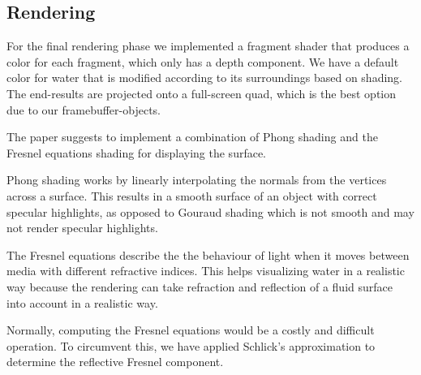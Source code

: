 \subsection{Rendering}
For the final rendering phase we implemented a fragment shader that produces a color for each fragment, which only has a depth component.
We have a default color for water that is modified according to its surroundings based on shading. 
The end-results are projected onto a full-screen quad, which is the best option due to our framebuffer-objects.

The paper suggests to implement a combination of Phong shading and the Fresnel equations shading for displaying the surface. 

Phong shading works by linearly interpolating the normals from the vertices across a surface\cite{phong1975illumination}. 
This results in a smooth surface of an object with correct specular highlights, as opposed to Gouraud shading which is not smooth and may not render specular highlights.

The Fresnel equations describe the the behaviour of light when it moves between media with different refractive indices. 
This helps visualizing water in a realistic way because the rendering can take refraction and reflection of a fluid surface into account in a realistic way.

Normally, computing the Fresnel equations would be a costly and difficult operation. To circumvent this, we have applied Schlick's approximation to determine the reflective Fresnel component.
